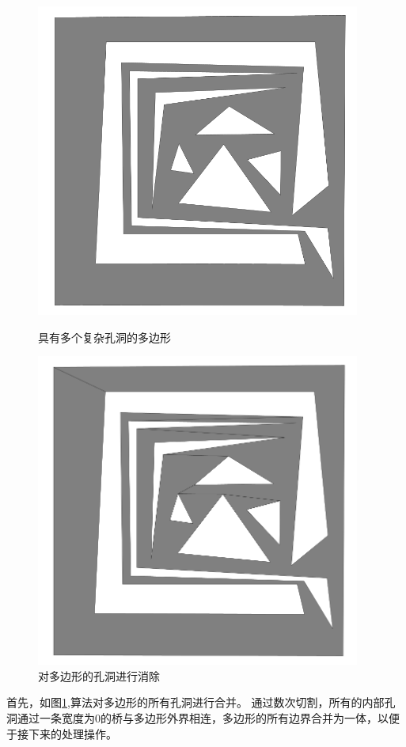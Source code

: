 \begin{figure}[htbp]
    \centering
    \begin{minipage}{0.4\textwidth}
        \centering
        \includegraphics[width=0.95\textwidth]
        {figures/polygon.png}
        \caption{具有多个复杂孔洞的多边形}
        \label{polygon}
    \end{minipage}
    \begin{minipage}{0.4\textwidth}
        \centering
        \includegraphics[width=0.95\textwidth]
        {figures/mergehole1.png}
        \caption{对多边形的孔洞进行消除}
        \label{mergehole}
    \end{minipage}
\end{figure}
首先，如图\ref*{mergehole},算法对多边形的所有孔洞进行合并。
通过数次切割，所有的内部孔洞通过一条宽度为0的桥与多边形外界相连，多边形的所有边界合并为一体，以便于接下来的处理操作。

